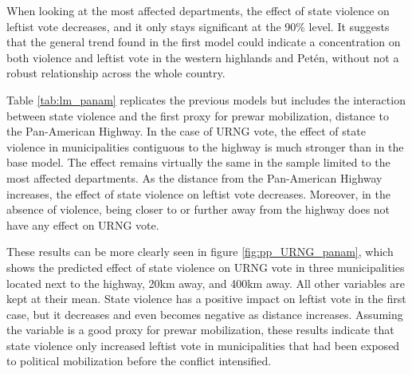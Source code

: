 \documentclass[12pt, notitlepage]{article}
\begin{document}


When looking at the most affected departments, the effect of state violence on leftist vote decreases, and it only stays significant at the 90\% level.
It suggests that the general trend found in the first model could indicate a concentration on both violence and leftist vote in the western highlands and Petén, without not a robust relationship across the whole country.

Table \ref{tab:lm_panam} replicates the previous models but includes the interaction between state violence and the first proxy for prewar mobilization, distance to the Pan-American Highway.
In the case of URNG vote, the effect of state violence in municipalities contiguous to the highway is much stronger than in the base model.
The effect remains virtually the same in the sample limited to the most affected departments.
As the distance from the Pan-American Highway increases, the effect of state violence on leftist vote decreases.
Moreover, in the absence of violence, being closer to or further away from the highway does not have any effect on URNG vote.



These results can be more clearly seen in figure \ref{fig:pp_URNG_panam}, which shows the predicted effect of state violence on URNG vote in three municipalities located next to the highway, 20km away, and 400km away.
All other variables are kept at their mean.
State violence has a positive impact on leftist vote in the first case, but it decreases and even becomes negative as distance increases.
Assuming the variable is a good proxy for prewar mobilization, these results indicate that state violence only increased leftist vote in municipalities that had been exposed to political mobilization before the conflict intensified.
\end{document}
